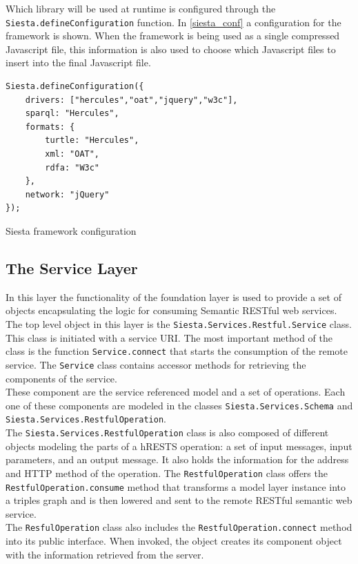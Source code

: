 Which library will be used at runtime is configured through the \texttt{Siesta.defineConfiguration} function. In
\ref{siesta_conf} a configuration for the framework is shown. When the framework is being used as a single compressed
Javascript file, this information is also used to choose which Javascript files to insert into the final Javascript
file.

\begin{table}
\vspace{5 mm}
\begin{lstlisting}
Siesta.defineConfiguration({
    drivers: ["hercules","oat","jquery","w3c"],
    sparql: "Hercules",
    formats: {
        turtle: "Hercules",
        xml: "OAT",
        rdfa: "W3c"
    },
    network: "jQuery"
});
\end{lstlisting} 
\vspace{5 mm}
\caption{Siesta framework configuration}
\label{siesta_conf}
\end{table}

\subsection{The Service Layer}

In this layer the functionality of the foundation layer is used to provide a set of objects encapsulating the logic for
consuming Semantic RESTful web services.\\

The top level object in this layer is the \texttt{Siesta.Services.Restful.Service} class. This class is initiated with a
service URI. The most important method of the class is the function \texttt{Service.connect} that starts the consumption
of the remote service. The \texttt{Service} class contains accessor methods for retrieving the components of the
service.\\

These component are the service referenced model and a set of operations. Each one of these components are modeled in
the classes \texttt{Siesta.Services.Schema} and \texttt{Siesta.Services.RestfulOperation}.\\

The \texttt{Siesta.Services.RestfulOperation} class is also composed of different objects modeling the parts of a
hRESTS operation: a set of input messages, input parameters, and an output message. It also holds the information for the address and HTTP
method of the operation. The \texttt{RestfulOperation} class offers the \texttt{RestfulOperation.consume} method that transforms a model
layer instance into a triples graph and is then lowered and sent to the remote RESTful semantic web service.\\  The \texttt{ResfulOperation} class also includes the \texttt{RestfulOperation.connect} method
into its public interface. When invoked, the object creates its component object with the information retrieved from the
server.\\

